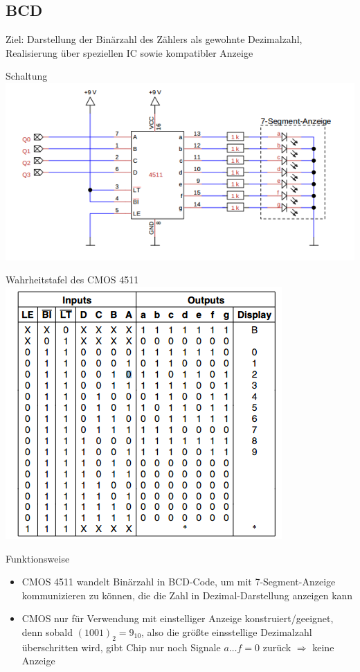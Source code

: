 \documentclass[compress,11pt]{beamer}
\begin{document}
\subsection{BCD}
\begin{frame}
Ziel: Darstellung der Binärzahl des Zählers als gewohnte Dezimalzahl, Realisierung über speziellen IC sowie kompatibler Anzeige
\begin{block}{Schaltung}
\includegraphics[scale=0.7]{a5sch}

\end{block}
\end{frame}
\begin{frame}
\begin{block}{Wahrheitstafel des CMOS 4511}
\includegraphics[scale=0.7]{a5tafel}

\end{block}
\end{frame}
\begin{frame}
\begin{block}{Funktionsweise}
\begin{itemize}

\item CMOS 4511 wandelt Binärzahl in BCD-Code, um mit 7-Segment-Anzeige kommunizieren zu können, die die Zahl in Dezimal-Darstellung anzeigen kann
\item CMOS nur für Verwendung mit einstelliger Anzeige konstruiert/geeignet, denn sobald $(1001)_2 = 9_{10}$, also die größte einsstellige Dezimalzahl überschritten wird, gibt Chip nur noch Signale $a \dots f = 0$ zurück $\Rightarrow$ keine Anzeige
\end{itemize}
\end{block}
\end{frame}
\end{document}
